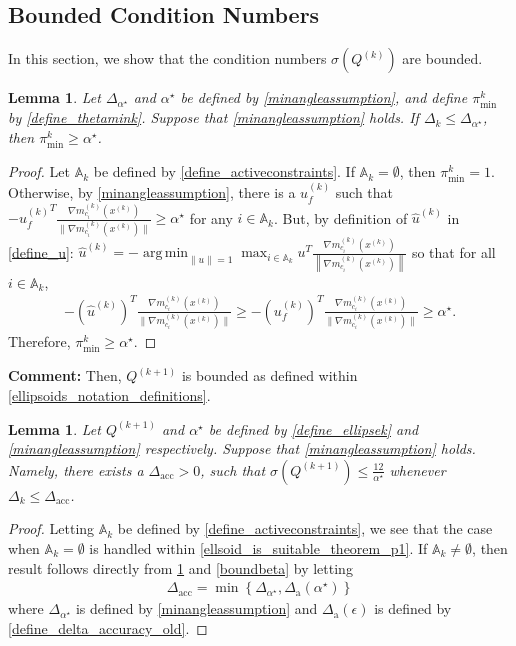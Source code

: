 \documentclass{article}
\newenvironment{comment}
  {\par\medskip
   \color{red}%
   \begin{framed}
   \textbf{Comment: }\ignorespaces}
 {\end{framed}
  \medskip}
\newtheorem{lemma}[theorem]{Lemma}
\theoremstyle{case}
\numberwithin{theorem}{subsection}
\DeclareMathOperator*{\argmin}{arg\,min}
\newcommand{\activeconstraintsk}{{\mathbb A_{k}}}
\newcommand{\dacc}{{\Delta_{\textrm{acc}}}}
\newcommand{\dacco}{{\Delta_{\textrm{a}}}}
\newcommand{\dk}{\Delta_k}
\newcommand{\gmcik}{{\nabla m_{c_i}^{(k)}\left(\xk\right)}}
\newcommand{\huk}{{{\hat u}^{(k)}}}
\newcommand{\minanglealpha}{{ \alpha^{\star} }}
\newcommand{\minangledelta}{{\Delta_{\alpha^{\star}}}}
\newcommand{\qk}{{Q^{(k)}}}
\newcommand{\thetamink}{{\pi^k_{\textrm{min}}}}
\newcommand{\xk}{x^{(k)}}
\newcommand{\qkpo}{{Q^{(k+1)}}}
\newcommand{\minangledirk}{{u^{(k)}_f}}
\begin{document}
\subsection{Bounded Condition Numbers}
In this section, we show that the condition numbers $\sigma(\qk)$ are bounded.

\begin{lemma}
\label{theta_min_is_bounded}
Let $\minangledelta$ and $\minanglealpha$ be defined by \cref{minangleassumption}, and
define $\thetamink$ by \cref{define_thetamink}.
Suppose that \cref{minangleassumption} holds.
If $\dk \le \minangledelta$, then $\thetamink \ge \minanglealpha$.
\end{lemma}

\begin{proof}
Let $\activeconstraintsk$ be defined by \cref{define_activeconstraints}.
If $\activeconstraintsk = \emptyset$, then $\thetamink = 1$.
Otherwise, by \cref{minangleassumption}, there is a $\minangledirk$ such that 
$-\minangledirk^T\frac{\gmcik}{\|\gmcik\|} \ge \minanglealpha$ for any $i \in \activeconstraintsk$.
But, by definition of $\huk$ in \cref{define_u}:
$\huk = -\argmin_{\|u\| = 1} \max_{i \in \activeconstraintsk} u^T\frac{\gmcik}{\left\|\gmcik\right\|}$
so that for all $i \in \activeconstraintsk$,
\begin{align*}
-\left(\huk\right)^T\frac{\gmcik}{\|\gmcik\|}  \ge -\left(\minangledirk\right)^T\frac{\gmcik}{\|\gmcik\|} \ge \minanglealpha.
\end{align*}
Therefore, $\thetamink \ge \minanglealpha$.
\end{proof}

\begin{comment}
Then, $\qkpo$ is bounded as defined within \cref{ellipsoids_notation_definitions}.
\end{comment}

\begin{lemma}
\label{bounded_condition_numbers}
Let $\qkpo$ and $\minanglealpha$ be defined by \cref{define_ellipsek} and \cref{minangleassumption} respectively.
Suppose that \cref{minangleassumption} holds.
Namely, there exists a $\dacc > 0$, such that $\sigma(\qkpo) \le \frac {12}{\minanglealpha}$ whenever $\dk \le \dacc$.
\end{lemma}
\begin{proof}
Letting $\activeconstraintsk$ be defined by \cref{define_activeconstraints}, we see that the case when $\activeconstraintsk = \emptyset$ is handled within \cref{ellsoid_is_suitable_theorem_p1}.
If $\activeconstraintsk \ne \emptyset$, then result follows directly from \cref{theta_min_is_bounded} and \cref{boundbeta} by letting
\begin{align}
\dacc = \min\left\{\minangledelta, \dacco(\minanglealpha) \right\} \label{define_delta_accuracy}
\end{align}
where $\minangledelta$ is defined by \cref{minangleassumption} and $\dacco(\epsilon)$ is defined by \cref{define_delta_accuracy_old}.
\end{proof}
\end{document}
